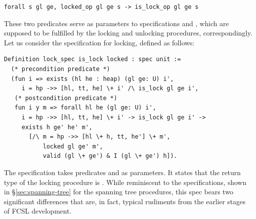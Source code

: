 \begin{lstlisting}
forall s gl ge, locked_op gl ge s -> is_lock_op gl ge s  
\end{lstlisting}

These two predicates serve as parameters to specifications
 and , which are supposed to be
fulfilled by the locking and unlocking procedures,
correspondingly. Let us consider the specification for locking,
defined as follows:

\begin{lstlisting}
Definition lock_spec is_lock locked : spec unit := 
  (* precondition predicate *)
  (fun i => exists (hl he : heap) (gl ge: U) i', 
     i = hp ->> [hl, tt, he] \+ i' /\ is_lock gl ge i', 
   (* postcondition predicate *)
   fun i y m => forall hl he (gl ge: U) i', 
     i = hp ->> [hl, tt, he] \+ i' -> is_lock gl ge i' ->
     exists h ge' he' m',
       [/\ m = hp ->> [hl \+ h, tt, he'] \+ m', 
           locked gl ge' m',
           valid (gl \+ ge') & I (gl \+ ge') h]).
\end{lstlisting}

The specification  takes predicates  and
 as parameters. It states that the return type of the
locking procedure is . While reminiscent to the
specifications, shown in \S \ref{sec:spanning-tree} for the spanning
tree procedures, this spec bears two significant differences that are,
in fact, typical rudiments from the earlier stages of FCSL
development.

